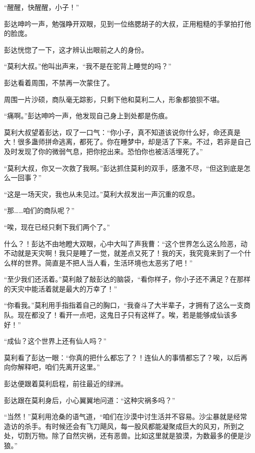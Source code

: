
\begin{this_body}

“醒醒，快醒醒，小子！”

彭达呻吟一声，勉强睁开双眼，见到一位络腮胡子的大叔，正用粗糙的手掌拍打他的脸庞。

彭达恍惚了一下，这才辨认出眼前之人的身份。

“莫利大叔。”他叫出声来，“我不是在驼背上睡觉的吗？”

彭达看着周围，不禁再一次蒙住了。

周围一片沙硕，商队毫无踪影，只剩下他和莫利二人，形象都狼狈不堪。

“痛啊。”彭达呻吟一声，他发现自己身上到处都是伤痕。

莫利大叔望着彭达，叹了一口气：“你小子，真不知道该说你什么好，命还真是大！很多蛊师拼命逃离，都死了。你在睡梦中，却是活了下来。不过，若非是自己及时发现了你的微弱气息，把你挖出来。恐怕你也被活活埋死了。”

“莫利大叔，你又一次救了我啊。”彭达抓住莫利的双手，感激不尽，“但这到底是怎么一回事？”

“这是一场天灾，我也从未见过。”莫利大叔发出一声沉重的叹息。

“那……咱们的商队呢？”

“唉，现在已经只剩下我们两个了。”

什么？！彭达不由地瞪大双眼，心中大叫了声我曹：“这个世界怎么这么险恶，动不动就是天灾啊！我只是睡了一觉，就差点又死了！我的天，我究竟来到了一个什么样的世界。简直是不把人当人看，生活环境也太恶劣了吧！”

“至少我们还活着。”莫利敲了敲彭达的脑袋，“看你样子，你小子还不满足？在那样的天灾中能活着就是最大的万幸了！”

“你看我。”莫利用手指指着自己的胸口，“我奋斗了大半辈子，才拥有了这么一支商队。现在都没了！看开一点吧，这鬼日子只有这样了。唉，若是能够成仙该多好！”

“成仙？这个世界上还有仙人吗？”

莫利看了彭达一眼：“你真的把什么都忘了？！连仙人的事情都忘了？唉，以后再向你解释吧，咱们先离开这里。”

彭达便跟着莫利启程，前往最近的绿洲。

彭达跟在莫利身后，小心翼翼地问道：“这种灾祸多吗？”

“当然！”莫利用沧桑的语气道，“咱们在沙漠中讨生活并不容易。沙尘暴就是经常造访的杀手。有时候还会有飞刀飓风，每一股风都能凝聚成巨大的风刃，所到之处，切割万物。除了自然灾祸，还有恶兽。比如这里就是狼漠，为数最多的便是沙狼。”


\end{this_body}
